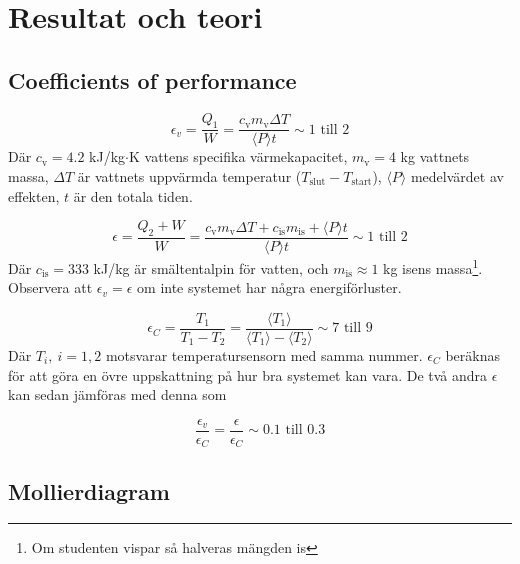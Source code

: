 \documentclass[11pt]{article}
\begin{document}
\section{Resultat och teori}

\subsection{Coefficients of performance}

\begin{equation}
    \epsilon_v = \frac{Q_1}{W} = \frac{c_{\text{v}} m_{\text{v}} \Delta T}{\langle P \rangle t} \sim 1 \text{ till } 2
\end{equation}
Där $c_{\text{v}} = 4.2$ kJ/kg$\cdot$K vattens specifika värmekapacitet, $m_{\text{v}} = 4$ kg vattnets massa, $\Delta T$ är vattnets uppvärmda temperatur ($T_{\text{slut}} -T_{\text{start}}$), $\langle P \rangle$ medelvärdet av effekten, $t$ är den totala tiden.

\begin{equation}
    \epsilon = \frac{Q_2 + W}{W} = \frac{c_{\text{v}} m_{\text{v}} \Delta T + c_{\text{is}} m_{\text{is}} + \langle P \rangle t}{\langle P \rangle t} \sim 1 \text{ till } 2
\end{equation}
Där $c_{\text{is}} = 333$ kJ/kg är smältentalpin för vatten, och $m_{\text{is}} \approx 1$ kg isens massa\footnote{Om studenten vispar så halveras mängden is}. Observera att $\epsilon_v = \epsilon$ om inte systemet har några energiförluster.

\begin{equation}
    \epsilon_C = \frac{T_1}{T_1 - T_2} = \frac{\langle T_1 \rangle}{\langle T_1 \rangle - \langle T_2 \rangle} \sim 7 \text{ till } 9
\end{equation}
Där $T_i, \ i = 1, 2$ motsvarar temperatursensorn med samma nummer. $\epsilon_C$ beräknas för att göra en övre uppskattning på hur bra systemet kan vara. De två andra $\epsilon$ kan sedan jämföras med denna som

\begin{equation}
    \frac{\epsilon_v}{\epsilon_C} = \frac{\epsilon}{\epsilon_C} \sim 0.1 \text{ till } 0.3
\end{equation}

\subsection{Mollierdiagram}
\end{document}
